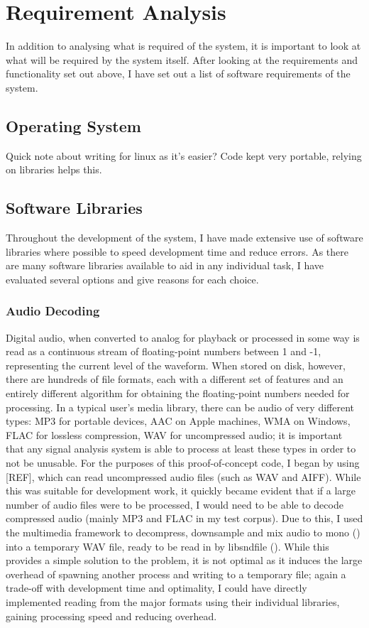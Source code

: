 \section{Requirement Analysis}
In addition to analysing what is required of the system, it is important to look at what will be required by the system itself. After looking at the requirements and functionality set out above, I have set out a list of software requirements of the system.
\subsection{Operating System}
Quick note about writing for linux as it's easier? Code kept very portable, relying on libraries helps this.
\subsection{Software Libraries}
Throughout the development of the system, I have made extensive use of software libraries where possible to speed development time and reduce errors. As there are many software libraries available to aid in any individual task, I have evaluated several options and give reasons for each choice.
\subsubsection{Audio Decoding}
Digital audio, when converted to analog for playback or processed in some way is read as a continuous stream of floating-point numbers between 1 and -1, representing the current level of the waveform. When stored on disk, however, there are hundreds of file formats, each with a different set of features and an entirely different algorithm for obtaining the floating-point numbers needed for processing. In a typical user's media library, there can be audio of very different types: MP3 for portable devices, AAC on Apple machines, WMA on Windows, FLAC for lossless compression, WAV for uncompressed audio; it is important that any signal analysis system is able to process at least these types in order to not be unusable. For the purposes of this proof-of-concept code, I began by using [REF], which can read uncompressed audio files (such as WAV and AIFF). While this was suitable for development work, it quickly became evident that if a large number of audio files were to be processed, I would need to be able to decode compressed audio (mainly MP3 and FLAC in my test corpus). Due to this, I used the  multimedia framework to decompress, downsample and mix audio to mono () into a temporary WAV file, ready to be read in by libsndfile (). While this provides a simple solution to the problem, it is not optimal as it induces the large overhead of spawning another process and writing to a temporary file; again a trade-off with development time and optimality, I could have directly implemented reading from the major formats using their individual libraries, gaining processing speed and reducing overhead.
